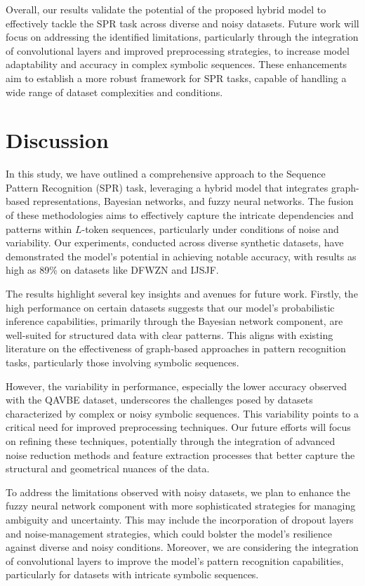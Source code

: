 \documentclass{article}
\begin{document}
Overall, our results validate the potential of the proposed hybrid model to effectively tackle the SPR task across diverse and noisy datasets. Future work will focus on addressing the identified limitations, particularly through the integration of convolutional layers and improved preprocessing strategies, to increase model adaptability and accuracy in complex symbolic sequences. These enhancements aim to establish a more robust framework for SPR tasks, capable of handling a wide range of dataset complexities and conditions.

\section{Discussion}
In this study, we have outlined a comprehensive approach to the Sequence Pattern Recognition (SPR) task, leveraging a hybrid model that integrates graph-based representations, Bayesian networks, and fuzzy neural networks. The fusion of these methodologies aims to effectively capture the intricate dependencies and patterns within \(L\)-token sequences, particularly under conditions of noise and variability. Our experiments, conducted across diverse synthetic datasets, have demonstrated the model's potential in achieving notable accuracy, with results as high as 89\% on datasets like DFWZN and IJSJF.

The results highlight several key insights and avenues for future work. Firstly, the high performance on certain datasets suggests that our model's probabilistic inference capabilities, primarily through the Bayesian network component, are well-suited for structured data with clear patterns. This aligns with existing literature on the effectiveness of graph-based approaches in pattern recognition tasks, particularly those involving symbolic sequences.

However, the variability in performance, especially the lower accuracy observed with the QAVBE dataset, underscores the challenges posed by datasets characterized by complex or noisy symbolic sequences. This variability points to a critical need for improved preprocessing techniques. Our future efforts will focus on refining these techniques, potentially through the integration of advanced noise reduction methods and feature extraction processes that better capture the structural and geometrical nuances of the data.

To address the limitations observed with noisy datasets, we plan to enhance the fuzzy neural network component with more sophisticated strategies for managing ambiguity and uncertainty. This may include the incorporation of dropout layers and noise-management strategies, which could bolster the model's resilience against diverse and noisy conditions. Moreover, we are considering the integration of convolutional layers to improve the model's pattern recognition capabilities, particularly for datasets with intricate symbolic sequences.
\end{document}
